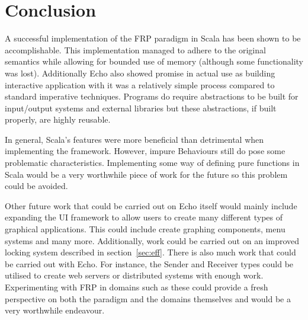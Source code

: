 \chapter{Conclusion}

A successful implementation of the FRP paradigm in Scala has been shown to be accomplishable. This implementation
managed to adhere to the original semantics while allowing for bounded use of memory (although some functionality was
lost). Additionally Echo also showed promise in actual use as building interactive application with it
was a relatively simple process compared to standard imperative techniques. Programs do require abstractions
to be built for input/output systems and external libraries but these abstractions, if built properly, are highly
reusable.

In general, Scala's features were more beneficial than detrimental when implementing the framework. However,
impure Behaviours still do pose some problematic characteristics. Implementing some way of defining pure functions
in Scala would be a very worthwhile piece of work for the future so this problem could be avoided.

Other future work that could be carried out on Echo itself would mainly include expanding the
UI framework to allow users to create many different types of graphical applications. This could include
create graphing components, menu systems and many more. Additionally,
work could be carried out on an improved locking system described in section~\ref{sec:eff}. There is also much
work that could be carried out with Echo. For instance, the Sender and Receiver types could be utilised
to create web servers or distributed systems with enough work. Experimenting with FRP in domains such as
these could provide a fresh perspective on both the paradigm and the domains themselves and would be a very
worthwhile endeavour.